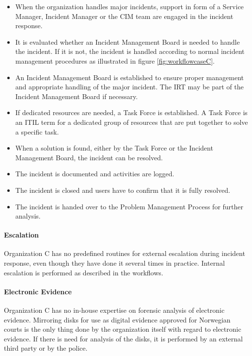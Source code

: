 \begin{itemize}\itemsep-0.1cm
\item When the organization handles major incidents, support in form of a Service Manager, Incident Manager or the \ac{CIM} team are engaged in the incident response.
\item It is evaluated whether an Incident Management Board is needed to handle the incident. If it is not, the incident is handled according to normal incident management procedures as illustrated in figure \ref{fig:workflowcaseC}.
\item An Incident Management Board is established to ensure proper management and appropriate handling of the major incident. The \ac{IRT} may be part of the Incident Management Board if necessary.
\item If dedicated resources are needed, a Task Force is established. A Task Force is an ITIL term for a dedicated group of resources that are put together to solve a specific task.
\item When a solution is found, either by the Task Force or the Incident Management Board, the incident can be resolved.
\item The incident is documented and activities are logged.
\item The incident is closed and users have to confirm that it is fully resolved.
\item The incident is handed over to the Problem Management Process for further analysis.  
\end{itemize}

\paragraph{Escalation}
Organization C has no predefined routines for external escalation during incident response, even though they have done it several times in practice. Internal escalation is performed as described in the workflows.

\paragraph{Electronic Evidence}
Organization C has no in-house expertise on forensic analysis of electronic evidence. Mirroring disks for use as digital evidence approved for Norwegian courts is the only thing done by the organization itself with regard to electronic evidence. If there is need for analysis of the disks, it is performed by an external third party or by the police.

